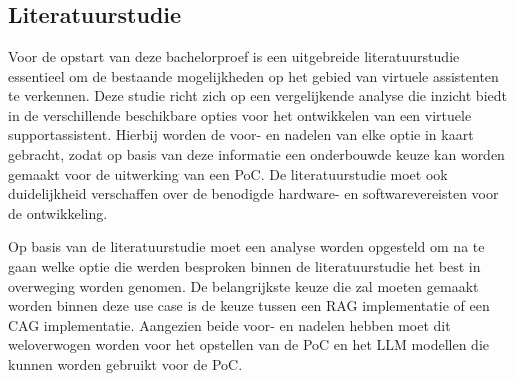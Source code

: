 
\chapter{}
\label{ch:methodologie}



\section{Literatuurstudie}
Voor de opstart van deze bachelorproef is een uitgebreide literatuurstudie essentieel om de bestaande mogelijkheden op het gebied van virtuele assistenten te verkennen. Deze studie richt zich op een vergelijkende analyse die inzicht biedt in de verschillende beschikbare opties voor het ontwikkelen van een virtuele supportassistent. Hierbij worden de voor- en nadelen van elke optie in kaart gebracht, zodat op basis van deze informatie een onderbouwde keuze kan worden gemaakt voor de uitwerking van een PoC. De literatuurstudie moet ook duidelijkheid verschaffen over de benodigde hardware- en softwarevereisten voor de ontwikkeling.

Op basis van de literatuurstudie moet een analyse worden opgesteld om na te gaan welke optie die werden besproken binnen de literatuurstudie het best in overweging worden genomen. De belangrijkste keuze die zal moeten gemaakt worden binnen deze use case is de keuze tussen een RAG implementatie of een CAG implementatie. Aangezien beide voor- en nadelen hebben moet dit weloverwogen worden voor het opstellen van de PoC en het LLM modellen die kunnen worden gebruikt voor de PoC.


